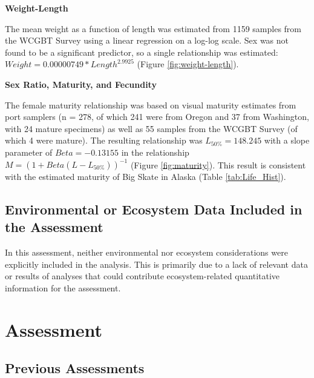\documentclass[12pt,]{article}
\begin{document}
\vspace{.5cm}

\textbf{Weight-Length}

The mean weight as a function of length was estimated from 1159 samples
from the WCGBT Survey using a linear regression on a log-log scale. Sex
was not found to be a significant predictor, so a single relationship
was estimated: \(Weight = 0.00000749 * Length ^ {2.9925}\) (Figure
\ref{fig:weight-length}).

\vspace{.5cm}

\textbf{Sex Ratio, Maturity, and Fecundity}

The female maturity relationship was based on visual maturity estimates
from port samplers (n = 278, of which 241 were from Oregon and 37 from
Washington, with 24 mature specimens) as well as 55 samples from the
WCGBT Survey (of which 4 were mature). The resulting relationship was
\(L_{50\%} = 148.245\) with a slope parameter of \(Beta = -0.13155\) in
the relationship \(M = (1 + Beta(L - L_{50\%}))^{-1}\) (Figure
\ref{fig:maturity}). This result is consistent with the estimated
maturity of Big Skate in Alaska (Table \ref{tab:Life_Hist}).

\vspace{.5cm}

\hypertarget{environmental-or-ecosystem-data-included-in-the-assessment}{%
\subsection{Environmental or Ecosystem Data Included in the
Assessment}\label{environmental-or-ecosystem-data-included-in-the-assessment}}

In this assessment, neither environmental nor ecosystem considerations
were explicitly included in the analysis. This is primarily due to a
lack of relevant data or results of analyses that could contribute
ecosystem-related quantitative information for the assessment.

\newpage

\hypertarget{assessment}{%
\section{Assessment}\label{assessment}}

\hypertarget{previous-assessments}{%
\subsection{Previous Assessments}\label{previous-assessments}}
\end{document}
